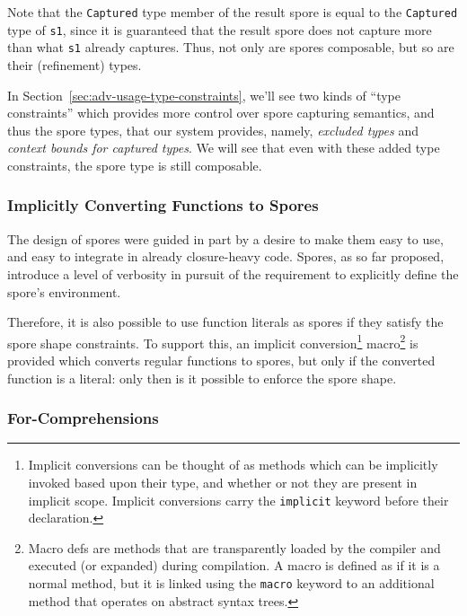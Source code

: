 \documentclass{llncs}
\begin{document}
Note that the \verb|Captured| type member of the result spore is equal to the
\verb|Captured| type of \verb|s1|, since it is guaranteed that the result
spore does not capture more than what \verb|s1| already captures. Thus, not
only are spores composable, but so are their (refinement) types.

In Section~\ref{sec:adv-usage-type-constraints}, we'll see two kinds of ``type
constraints'' which provides more control over spore capturing semantics, and
thus the spore types, that our system provides, namely, {\em excluded types} and
{\em context bounds for captured types}. We will see that even with these added type constraints, the spore type is still composable.

\subsubsection{Implicitly Converting Functions to Spores}

The design of spores were guided in part by a desire to make them easy to use,
and easy to integrate in already closure-heavy code. Spores, as so far
proposed, introduce a level of verbosity in pursuit of the requirement to
explicitly define the spore's environment.

Therefore, it is also possible to use function literals as spores if they
satisfy the spore shape constraints. To support this, an implicit
conversion\footnote{Implicit conversions can be thought of as methods which can be implicitly invoked based upon their type, and whether or not they are present in implicit scope. Implicit conversions carry the \texttt{implicit} keyword before their declaration.}
macro\footnote{Macro defs are methods that are transparently loaded by the compiler and executed (or expanded) during compilation. A macro is defined as if it is a normal method, but it is linked using the \texttt{macro} keyword to an additional method that operates on abstract syntax trees.} is provided which converts regular
functions to spores, but only if the converted function is a literal: only
then is it possible to enforce the spore shape.


\subsubsection{For-Comprehensions}



\end{document}
